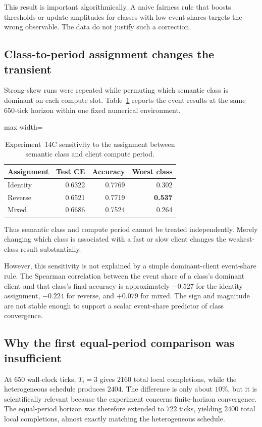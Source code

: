 This result is important algorithmically. A naive fairness rule that boosts thresholds or update amplitudes for classes with low event shares targets the wrong observable. The data do not justify such a correction.

\subsection{Class-to-period assignment changes the transient}

Strong-skew runs were repeated while permuting which semantic class is dominant on each compute slot. Table~\ref{tab:exp14c-period-assignment} reports the event results at the same $650$-tick horizon within one fixed numerical environment.
\begin{table}[ht]
\centering
\small
\caption{Experiment~14C sensitivity to the assignment between semantic class and client compute period.}
\label{tab:exp14c-period-assignment}
\begin{adjustbox}{max width=\textwidth}
\begin{tabular}{lrrr}
\toprule
Assignment & Test CE & Accuracy & Worst class\\
\midrule
Identity & 0.6322 & 0.7769 & 0.302\\
Reverse & 0.6521 & 0.7719 & \textbf{0.537}\\
Mixed & 0.6686 & 0.7524 & 0.264\\
\bottomrule
\end{tabular}
\end{adjustbox}
\end{table}
Thus semantic class and compute period cannot be treated independently. Merely changing which class is associated with a fast or slow client changes the weakest-class result substantially.

However, this sensitivity is not explained by a simple dominant-client event-share rule. The Spearman correlation between the event share of a class's dominant client and that class's final accuracy is approximately $-0.527$ for the identity assignment, $-0.224$ for reverse, and $+0.079$ for mixed. The sign and magnitude are not stable enough to support a scalar event-share predictor of class convergence.

\subsection{Why the first equal-period comparison was insufficient}

At $650$ wall-clock ticks, $T_i=3$ gives $2160$ total local completions, while the heterogeneous schedule produces $2404$. The difference is only about $10\%$, but it is scientifically relevant because the experiment concerns finite-horizon convergence. The equal-period horizon was therefore extended to $722$ ticks, yielding $2400$ total local completions, almost exactly matching the heterogeneous schedule.

